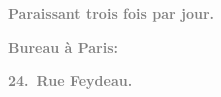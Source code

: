 \pstart
           \begin{otherlanguage}{french}\textcolor{gray}{\textbf{\textbf{Paraissant trois fois par jour.}}}\end{otherlanguage}\pend
           
\pstart
           \begin{otherlanguage}{french}\textcolor{gray}{\textbf{\textbf{Bureau à Paris:}}}\end{otherlanguage}\pend
           
\pstart
           \begin{otherlanguage}{french}\textcolor{gray}{\textbf{\textbf{24. Rue Feydeau.}}}\end{otherlanguage}\pend
           
